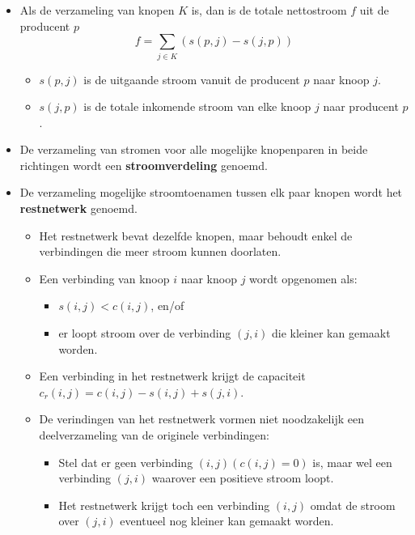\begin{itemize}
\begin{itemize}
    \end{itemize}
    \item Als de verzameling van knopen $K$ is, dan is de totale nettostroom $f$ uit de producent $p$
    $$f = \sum_{j \in K} (s(p, j) - s(j, p))$$ 
    \begin{itemize}
        \item $s(p, j)$ is de uitgaande stroom vanuit de producent $p$ naar knoop $j$.
        \item $s(j, p)$ is de totale inkomende stroom van elke knoop $j$ naar producent $p$.
    \end{itemize}
    \item De verzameling van stromen voor alle mogelijke knopenparen in beide richtingen wordt een \textbf{stroomverdeling} genoemd.
    \item De verzameling mogelijke stroomtoenamen tussen elk paar knopen wordt het \textbf{restnetwerk} genoemd.
    \begin{itemize}
        \item Het restnetwerk bevat dezelfde knopen, maar behoudt enkel de verbindingen die meer stroom kunnen doorlaten.
        \item Een verbinding van knoop $i$ naar knoop $j$ wordt opgenomen als:
        \begin{itemize}
            \item  $s(i, j) < c(i, j)$, en/of
            \item  er loopt stroom over de verbinding $(j, i)$ die kleiner kan gemaakt worden.
        \end{itemize}
        \item Een verbinding in het restnetwerk krijgt de capaciteit $c_r(i, j) = c(i, j) - s(i, j) + s(j, i)$.
        \item De verindingen van het restnetwerk vormen niet noodzakelijk een deelverzameling van de originele verbindingen:
        \begin{itemize}
            \item Stel dat er geen verbinding $(i, j) (c(i, j) = 0)$ is, maar wel een verbinding $(j, i)$ waarover een positieve stroom loopt.
            \item Het restnetwerk krijgt toch een verbinding $(i, j)$ omdat de stroom over $(j, i)$ eventueel nog kleiner kan gemaakt worden.
        \end{itemize}
        

\end{itemize}
\end{itemize}
